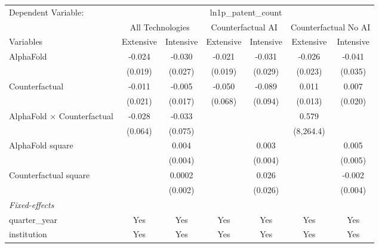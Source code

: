 \begingroup
\centering
\begin{tabular}{lcccccc}
   \tabularnewline \midrule \midrule
   Dependent Variable: & \multicolumn{6}{c}{ln1p\_patent\_count}\\
 & \multicolumn{2}{c}{All Technologies} & \multicolumn{2}{c}{Counterfactual AI} & \multicolumn{2}{c}{Counterfactual No AI} \\
\cmidrule(lr){1-1}\cmidrule(lr){2-3} \cmidrule(lr){4-5} \cmidrule(lr){6-7}
Variables & \multicolumn{1}{c}{Extensive} & \multicolumn{1}{c}{Intensive} & \multicolumn{1}{c}{Extensive} & \multicolumn{1}{c}{Intensive} & \multicolumn{1}{c}{Extensive} & \multicolumn{1}{c}{Intensive} \\
\cmidrule(lr){1-1}\cmidrule(lr){2-2} \cmidrule(lr){3-3} \cmidrule(lr){4-4} \cmidrule(lr){5-5} \cmidrule(lr){6-6} \cmidrule(lr){7-7}
   AlphaFold                          & -0.024  & -0.030  & -0.021  & -0.031  & -0.026    & -0.041\\   
                                      & (0.019) & (0.027) & (0.019) & (0.029) & (0.023)   & (0.035)\\   
   Counterfactual                     & -0.011  & -0.005  & -0.050  & -0.089  & 0.011     & 0.007\\   
                                      & (0.021) & (0.017) & (0.068) & (0.094) & (0.013)   & (0.020)\\   
   AlphaFold $\times$ Counterfactual  & -0.028  & -0.033  &         &         & 0.579     &   \\   
                                      & (0.064) & (0.075) &         &         & (8,264.4) &   \\   
   AlphaFold square                   &         & 0.004   &         & 0.003   &           & 0.005\\   
                                      &         & (0.004) &         & (0.004) &           & (0.005)\\   
   Counterfactual square              &         & 0.0002  &         & 0.026   &           & -0.002\\   
                                      &         & (0.002) &         & (0.026) &           & (0.004)\\   
   \midrule
   \emph{Fixed-effects}\\
   quarter\_year                      & Yes     & Yes     & Yes     & Yes     & Yes       & Yes\\  
   institution                        & Yes     & Yes     & Yes     & Yes     & Yes       & Yes\\  

\end{tabular}
